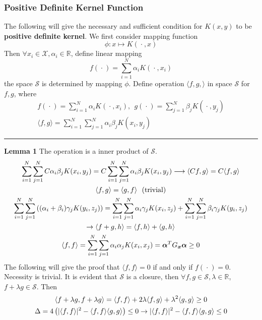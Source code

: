 \documentclass[12pt]{article}
\newcommand{\bdot}{~\bm{\cdot}~}
\newcommand{\la}{\langle}
\newcommand{\ra}{\rangle}
\begin{document}
\subsubsection{Positive Definite Kernel Function}
The following will give the necessary and sufficient condition for $K(x, y)$ to be \textbf{positive definite kernel}. We first consider mapping function
\begin{equation}
    \phi: x \mapsto K(\bdot, x)
\end{equation}
Then $\forall x_i \in \mathcal{X},\alpha_i \in \mathbb{R}$, define linear mapping
\begin{equation}
    f(\bdot) = \sum_{i=1}^N \alpha_i K(\bdot, x_i)
\end{equation} 
the space $\mathcal{S}$ is determined by mapping $\phi$. Define operation $\langle f, g, \rangle$ in space $\mathcal{S}$ for $f, g$, where
\begin{gather}
    f(\bdot) = \sum_{i=1}^N \alpha_i K(\bdot, x_i),~~
    g(\bdot) = \sum_{j=1}^N \beta_j K(\bdot, y_j) \\
    \langle f, g \rangle = \sum_{i=1}^N\sum_{j=1}^N \alpha_i \beta_j K(x_i, y_j)
\end{gather}
\rule[-5pt]{\linewidth}{0.07em}
\noindent \textbf{Lemma 1} The operation is a inner product of $\mathcal{S}$.
\begin{gather}
    \sum_{i=1}^N\sum_{j=1}^N C\alpha_i \beta_j K(x_i, y_j) = C\sum_{i=1}^N\sum_{j=1}^N \alpha_i \beta_j K(x_i, y_j) \longrightarrow \la Cf, g \ra = C\la f, g \ra \\
    \la f, g \ra = \la g, f \ra~~(\text{trivial}) \\
    \sum_{i=1}^N\sum_{j=1}^N \left( (\alpha_i + \beta_i) \gamma_j K(y_i, z_j) \right) = \sum_{i=1}^N\sum_{j=1}^N  \alpha_i \gamma_j K(x_i, z_j) + \sum_{i=1}^N \sum_{j=1}^N \beta_i \gamma_j K(y_i, z_j) \notag\\ \rightarrow \la f+g, h \ra = \la f, h \ra + \la g, h \ra \\
    \la f, f \ra = \sum_{i=1}^N \sum_{j=1}^N \alpha_i \alpha_j K(x_i, x_j) = \bm{\alpha}^TG_{\bm{x}}\bm{\alpha} \geq 0 
\end{gather}
The following will give the proof that $\la f, f \ra = 0$ if and only if $f(\bdot) = 0$. Necessity is trivial. It is evident that $\mathcal{S}$ is a closure, then $\forall f, g \in \mathcal{S}, \lambda \in \mathbb{R}$, $f + \lambda g \in \mathcal{S}$. Then
\begin{gather}
    \la f + \lambda g, f + \lambda g \ra = \la f, f \ra + 2\lambda \la f, g \ra + \lambda^2 \la g, g \ra \geq 0 \notag \\
    \Delta = 4\left(|\la f, f \ra |^2 - \la f, f \ra \la g, g \ra \right) \leq 0 \rightarrow |\la f, f \ra |^2 - \la f, f \ra \la g, g \ra \leq 0
\end{gather}
\end{document}
